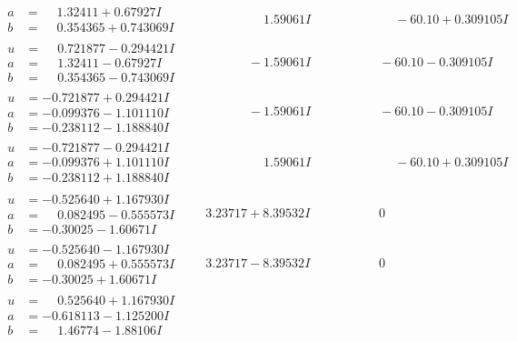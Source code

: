 \documentclass[1p]{elsarticle_modified}
\theoremstyle{definition}
\begin{document}
$$\begin{array}{c|c|c}
\begin{aligned}
a &= \phantom{-}1.32411 + 0.67927 I \\
b &= \phantom{-}0.354365 + 0.743069 I\end{aligned}
 & \phantom{-0.000000 -}1.59061 I & \phantom{-0.000000 -}     -6
0. 10   + 0.309105 I \\ \hline\begin{aligned}
u &= \phantom{-}0.721877 - 0.294421 I \\
a &= \phantom{-}1.32411 - 0.67927 I \\
b &= \phantom{-}0.354365 - 0.743069 I\end{aligned}
 & \phantom{-0.000000 } -1.59061 I & \phantom{-0.000000 }      -6
0. 10   - 0.309105 I \\ \hline\begin{aligned}
u &= -0.721877 + 0.294421 I \\
a &= -0.099376 - 1.101110 I \\
b &= -0.238112 - 1.188840 I\end{aligned}
 & \phantom{-0.000000 } -1.59061 I & \phantom{-0.000000 }      -6
0. 10   - 0.309105 I \\ \hline\begin{aligned}
u &= -0.721877 - 0.294421 I \\
a &= -0.099376 + 1.101110 I \\
b &= -0.238112 + 1.188840 I\end{aligned}
 & \phantom{-0.000000 -}1.59061 I & \phantom{-0.000000 -}     -6
0. 10   + 0.309105 I \\ \hline\begin{aligned}
u &= -0.525640 + 1.167930 I \\
a &= \phantom{-}0.082495 - 0.555573 I \\
b &= -0.30025 - 1.60671 I\end{aligned}
 & \phantom{-}3.23717 + 8.39532 I & \phantom{-0.000000 } 0 \\ \hline\begin{aligned}
u &= -0.525640 - 1.167930 I \\
a &= \phantom{-}0.082495 + 0.555573 I \\
b &= -0.30025 + 1.60671 I\end{aligned}
 & \phantom{-}3.23717 - 8.39532 I & \phantom{-0.000000 } 0 \\ \hline\begin{aligned}
u &= \phantom{-}0.525640 + 1.167930 I \\
a &= -0.618113 - 1.125200 I \\
b &= \phantom{-}1.46774 - 1.88106 I\end{aligned}

\end{array}$$
\end{document}
